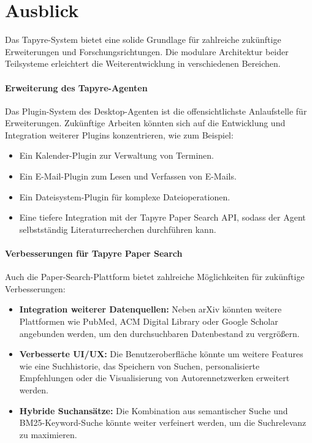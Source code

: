 \section{Ausblick}
Das Tapyre-System bietet eine solide Grundlage für zahlreiche zukünftige Erweiterungen und Forschungsrichtungen. Die modulare Architektur beider Teilsysteme erleichtert die Weiterentwicklung in verschiedenen Bereichen.

\paragraph{Erweiterung des Tapyre-Agenten}
Das Plugin-System des Desktop-Agenten ist die offensichtlichste Anlaufstelle für Erweiterungen. Zukünftige Arbeiten könnten sich auf die Entwicklung und Integration weiterer Plugins konzentrieren, wie zum Beispiel:
\begin{itemize}
	\item Ein Kalender-Plugin zur Verwaltung von Terminen.
	\item Ein E-Mail-Plugin zum Lesen und Verfassen von E-Mails.
	\item Ein Dateisystem-Plugin für komplexe Dateioperationen.
	\item Eine tiefere Integration mit der Tapyre Paper Search API, sodass der Agent selbstständig Literaturrecherchen durchführen kann.
\end{itemize}

\paragraph{Verbesserungen für Tapyre Paper Search}
Auch die Paper-Search-Plattform bietet zahlreiche Möglichkeiten für zukünftige Verbesserungen:
\begin{itemize}
	\item \textbf{Integration weiterer Datenquellen:} Neben arXiv könnten weitere Plattformen wie PubMed, ACM Digital Library oder Google Scholar angebunden werden, um den durchsuchbaren Datenbestand zu vergrößern.
	\item \textbf{Verbesserte UI/UX:} Die Benutzeroberfläche könnte um weitere Features wie eine Suchhistorie, das Speichern von Suchen, personalisierte Empfehlungen oder die Visualisierung von Autorennetzwerken erweitert werden.
	\item \textbf{Hybride Suchansätze:} Die Kombination aus semantischer Suche und BM25-Keyword-Suche könnte weiter verfeinert werden, um die Suchrelevanz zu maximieren.
\end{itemize}

